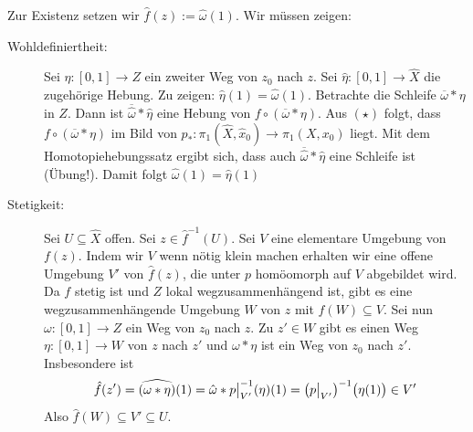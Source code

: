 Zur Existenz setzen wir $\hat{f}(z) := \hat{\omega}(1)$. Wir müssen zeigen:
\begin{description}
	\item[Wohldefiniertheit:] Sei $\eta : [0,1] \to Z$ ein zweiter Weg von $z_0$ nach $z$. Sei $\hat{\eta} : [0,1] \to \hat{X}$ die zugehörige Hebung. Zu zeigen: 
	$\hat{\eta}(1) = \hat{\omega}(1)$. Betrachte die Schleife $\overline{\omega} * \eta$ in $Z$. Dann ist $\overline{\hat{\omega}} * \hat{\eta}$ eine Hebung von
	$f \circ (\overline{\omega} * \eta)$. Aus $(\star)$ folgt, dass $f \circ (\overline{\omega} * \eta )$ im Bild von $p_* : \pi_1(\hat{X}, \hat{x}_0) \to \pi_1(X,x_0)$ 
	liegt. Mit dem Homotopiehebungssatz ergibt sich, dass auch $\overline{\hat{\omega}} * \hat{\eta}$ eine Schleife ist (Übung!). Damit folgt 
	$\hat{\omega}(1)= \hat{\eta}(1)$
	\item[Stetigkeit:] Sei $U \subseteq \hat{X}$ offen. Sei $z \in \hat{f} ^{-1} (U)$. Sei $V$ eine elementare Umgebung von $f(z)$. Indem wir $V$ wenn nötig klein machen
	erhalten wir eine offene Umgebung $V'$ von $\hat{f}(z)$, die unter $p$ homöomorph auf $V$ abgebildet wird. Da $f$ stetig ist und $Z$ lokal wegzusammenhängend ist, gibt
	es eine wegzusammenhängende Umgebung $W$ von $z$ mit $f(W) \subseteq V$. Sei nun $\omega : [0,1] \to Z$ ein Weg von $z_0$ nach $z$. Zu $z' \in W$ gibt es einen Weg
	$\eta : [0,1] \to W$ von $z$ nach $z'$ und $\omega * \eta$ ist ein Weg von $z_0$ nach $z'$. Insbesondere ist 
	\[
		\hat{f}(z') = \widehat{(\omega * \eta)} (1)= \hat{\omega} * p\big|_{V'} ^{-1} (\eta) (1) = \enbrace*{p \big|_{V'}} ^{-1} \enbrace[\big]{\eta(1)} \in V'  
	\]
	Also $\hat{f}(W) \subseteq V' \subseteq U$. \bewende
\end{description}

